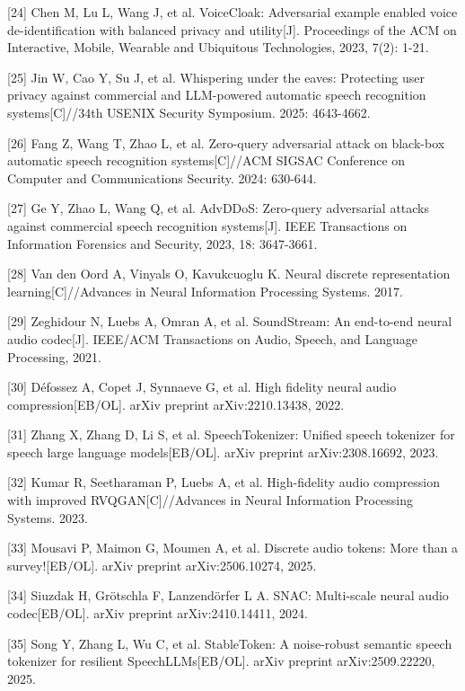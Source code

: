 \begin{referencesblock}
{[}24{]} Chen M, Lu L, Wang J, et al. VoiceCloak: Adversarial example
enabled voice de-identification with balanced privacy and
utility{[}J{]}. Proceedings of the ACM on Interactive, Mobile, Wearable
and Ubiquitous Technologies, 2023, 7(2): 1-21.

{[}25{]} Jin W, Cao Y, Su J, et al. Whispering under the eaves:
Protecting user privacy against commercial and LLM-powered automatic
speech recognition systems{[}C{]}//34th USENIX Security Symposium. 2025:
4643-4662.

{[}26{]} Fang Z, Wang T, Zhao L, et al. Zero-query adversarial attack on
black-box automatic speech recognition systems{[}C{]}//ACM SIGSAC
Conference on Computer and Communications Security. 2024: 630-644.

{[}27{]} Ge Y, Zhao L, Wang Q, et al. AdvDDoS: Zero-query adversarial
attacks against commercial speech recognition systems{[}J{]}. IEEE
Transactions on Information Forensics and Security, 2023, 18: 3647-3661.

{[}28{]} Van den Oord A, Vinyals O, Kavukcuoglu K. Neural discrete
representation learning{[}C{]}//Advances in Neural Information
Processing Systems. 2017.

{[}29{]} Zeghidour N, Luebs A, Omran A, et al. SoundStream: An
end-to-end neural audio codec{[}J{]}. IEEE/ACM Transactions on Audio,
Speech, and Language Processing, 2021.

{[}30{]} Défossez A, Copet J, Synnaeve G, et al. High fidelity neural
audio compression{[}EB/OL{]}. arXiv preprint arXiv:2210.13438, 2022.

{[}31{]} Zhang X, Zhang D, Li S, et al. SpeechTokenizer: Unified speech
tokenizer for speech large language models{[}EB/OL{]}. arXiv preprint
arXiv:2308.16692, 2023.

{[}32{]} Kumar R, Seetharaman P, Luebs A, et al. High-fidelity audio
compression with improved RVQGAN{[}C{]}//Advances in Neural Information
Processing Systems. 2023.

{[}33{]} Mousavi P, Maimon G, Moumen A, et al. Discrete audio tokens:
More than a survey!{[}EB/OL{]}. arXiv preprint arXiv:2506.10274, 2025.

{[}34{]} Siuzdak H, Grötschla F, Lanzendörfer L A. SNAC: Multi-scale
neural audio codec{[}EB/OL{]}. arXiv preprint arXiv:2410.14411, 2024.

{[}35{]} Song Y, Zhang L, Wu C, et al. StableToken: A noise-robust
semantic speech tokenizer for resilient SpeechLLMs{[}EB/OL{]}. arXiv
preprint arXiv:2509.22220, 2025.


\end{referencesblock}
